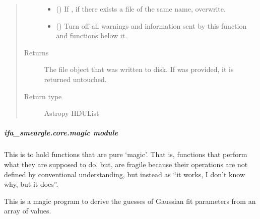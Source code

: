 \documentclass[letterpaper,10pt,english]{sphinxmanual}
\begin{document}
\begin{fulllineitems}
\begin{quote}
\begin{description}
\begin{itemize}
\item {} 
 (\sphinxstyleliteralemphasis{\sphinxupquote{ (}}\sphinxstyleliteralemphasis{\sphinxupquote{)}}) \textendash{} If , if there exists a file of the same name,
overwrite.

\item {} 
 (\sphinxstyleliteralemphasis{\sphinxupquote{ (}}\sphinxstyleliteralemphasis{\sphinxupquote{)}}) \textendash{} Turn off all warnings and information sent by this function
and functions below it.

\end{itemize}

\item[{Returns}] \leavevmode
{} \textendash{} The file object that was written to disk. If 
was provided, it is returned untouched.

\item[{Return type}] \leavevmode
Astropy HDUList

\end{description}\end{quote}

\end{fulllineitems}



\subparagraph{ifa\_smeargle.core.magic module}
\label{\detokenize{docstrings/ifa_smeargle.core.magic:module-ifa_smeargle.core.magic}}\label{\detokenize{docstrings/ifa_smeargle.core.magic:ifa-smeargle-core-magic-module}}\label{\detokenize{docstrings/ifa_smeargle.core.magic::doc}}
This is to hold functions that are pure ‘magic’. That is, functions
that perform what they are supposed to do, but, are fragile because
their operations are not defined by conventional understanding, but
instead as “it works, I don’t know why, but it does”.

\begin{fulllineitems}
\label{\detokenize{docstrings/ifa_smeargle.core.magic:ifa_smeargle.core.magic.magic_inital_gaussian_parameters}}
This is a magic program to derive the guesses of Gaussian fit
parameters from an array of values.

\end{fulllineitems}
\end{document}
